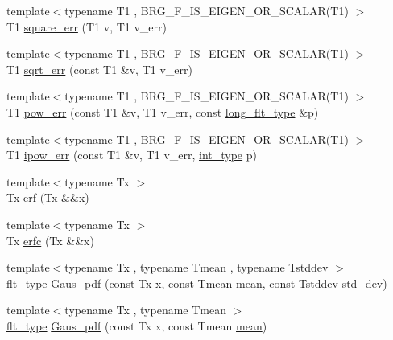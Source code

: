 \begin{DoxyCompactItemize}
\item 
{\footnotesize template$<$typename T1 , B\-R\-G\-\_\-\-F\-\_\-\-I\-S\-\_\-\-E\-I\-G\-E\-N\-\_\-\-O\-R\-\_\-\-S\-C\-A\-L\-A\-R(\-T1) $>$ }\\T1 \hyperlink{namespaceIceBRG_ae39a991d56ebe65d206807140a5389b4}{square\-\_\-err} (T1 v, T1 v\-\_\-err)
\item 
{\footnotesize template$<$typename T1 , B\-R\-G\-\_\-\-F\-\_\-\-I\-S\-\_\-\-E\-I\-G\-E\-N\-\_\-\-O\-R\-\_\-\-S\-C\-A\-L\-A\-R(\-T1) $>$ }\\T1 \hyperlink{namespaceIceBRG_a2f0a4e4c33a8437fab257f602f5f9b03}{sqrt\-\_\-err} (const T1 \&v, T1 v\-\_\-err)
\item 
{\footnotesize template$<$typename T1 , B\-R\-G\-\_\-\-F\-\_\-\-I\-S\-\_\-\-E\-I\-G\-E\-N\-\_\-\-O\-R\-\_\-\-S\-C\-A\-L\-A\-R(\-T1) $>$ }\\T1 \hyperlink{namespaceIceBRG_a2de650b0f4e004fd68bbba6414369d6a}{pow\-\_\-err} (const T1 \&v, T1 v\-\_\-err, const \hyperlink{lib_2IceBRG__main_2common_8h_a7040956e7e1b504d34a9ccfb4253bdce}{long\-\_\-flt\-\_\-type} \&p)
\item 
{\footnotesize template$<$typename T1 , B\-R\-G\-\_\-\-F\-\_\-\-I\-S\-\_\-\-E\-I\-G\-E\-N\-\_\-\-O\-R\-\_\-\-S\-C\-A\-L\-A\-R(\-T1) $>$ }\\T1 \hyperlink{namespaceIceBRG_a9c1dffeb9bad10147701507dcb91faf5}{ipow\-\_\-err} (const T1 \&v, T1 v\-\_\-err, \hyperlink{lib_2IceBRG__main_2common_8h_ac4de9d9335536ac22821171deec8d39e}{int\-\_\-type} p)
\item 
{\footnotesize template$<$typename Tx $>$ }\\Tx \hyperlink{namespaceIceBRG_a2928d6109d3a3e013f025bce4a9d1189}{erf} (Tx \&\&x)
\item 
{\footnotesize template$<$typename Tx $>$ }\\Tx \hyperlink{namespaceIceBRG_a9eb8301c8a38e4f1336c7de5623fd1db}{erfc} (Tx \&\&x)
\item 
{\footnotesize template$<$typename Tx , typename Tmean , typename Tstddev $>$ }\\\hyperlink{lib_2IceBRG__main_2common_8h_ad0f130a56eeb944d9ef2692ee881ecc4}{flt\-\_\-type} \hyperlink{namespaceIceBRG_a73cf4343d44ab035f5c003bcdf91512f}{Gaus\-\_\-pdf} (const Tx x, const Tmean \hyperlink{namespaceIceBRG_a31912d66a78938bcc3e0fdbc917c5eec}{mean}, const Tstddev std\-\_\-dev)
\item 
{\footnotesize template$<$typename Tx , typename Tmean $>$ }\\\hyperlink{lib_2IceBRG__main_2common_8h_ad0f130a56eeb944d9ef2692ee881ecc4}{flt\-\_\-type} \hyperlink{namespaceIceBRG_a89dab16190cfd407bbce8198ba2e47f1}{Gaus\-\_\-pdf} (const Tx x, const Tmean \hyperlink{namespaceIceBRG_a31912d66a78938bcc3e0fdbc917c5eec}{mean})

\end{DoxyCompactItemize}
